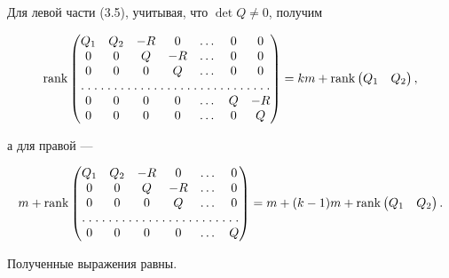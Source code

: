 \begin{pf} 


Для левой части (3.5), учитывая, что $\det Q\ne0$, получим 


$$ 


\rank 


\begin{pmatrix} 


Q_1 & Q_2 & -R & 0 & \dotsc & 0 & 0 \\ 


0 & 0 & Q & -R & \dotsc & 0 & 0 \\ 


0 & 0 & 0 & Q & \dotsc & 0 & 0 \\ 


\hdotsfor[1.5]{7} \\


0 & 0 & 0 & 0 & \dotsc & Q & -R \\ 


0 & 0 & 0 & 0 & \dotsc & 0 & Q 


\end{pmatrix} 


=km+\rank\begin{pmatrix}Q_1 & Q_2 \end{pmatrix}, 


$$ 


а для правой --- 


$$ 


m+\rank 


\begin{pmatrix} 


Q_1 & Q_2 & -R & 0 & \dotsc & 0 \\ 


0 & 0 & Q & -R & \dotsc & 0 \\ 


0 & 0 & 0 & Q & \dotsc & 0 \\ 


\hdotsfor[1.5]{6} \\


0 & 0 & 0 & 0 & \dotsc & Q 


\end{pmatrix} 


=m+(k-1)m+\rank\begin{pmatrix}Q_1 & Q_2 \end{pmatrix}. 


$$ 


Полученные выражения равны. 


\end{pf} 



